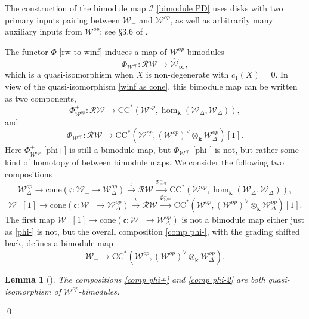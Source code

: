 \documentclass[11pt]{amsproc}
\def\K{{\mathbf{k}}}
\def\w{\mathcal{W}(E)}
\def\r#1{\mathrm{#1}}
\def\w{\mathcal{W}}
\def\rw{\mathcal{RW}}
\def\D{\Delta}
\def\cone{\mathrm{cone}}
\def\winf{\widehat{\w}_{\infty}}
\def\ck{\mathfrak{c}}
\newtheorem{lem}{Lemma}[section]
\theoremstyle{remark}
\numberwithin{equation}{section}
\begin{document}
The construction of the bimodule map $\mathcal{I}$ \eqref{bimodule PD} uses disks with two primary inputs pairing between $\w_{-}$ and $\w^{op}$, 
as well as arbitrarily many auxiliary inputs from $\w^{op}$; see \S 3.6 of \cite{GGV}.

The functor $\Phi$ \eqref{rw to winf} induces a map of $\w^{op}$-bimodules
\begin{equation}\label{rw to winf as bimod}
\Phi_{\w^{op}}: \rw \to \winf,
\end{equation}
which is a quasi-isomorphism when $X$ is non-degenerate with $c_{1}(X) = 0$.
In view of the quasi-isomorphism \eqref{winf as cone}, 
this bimodule map can be written as two components,
\begin{equation}\label{phi+}
\Phi^{+}_{\w^{op}}: \rw \to \r{CC}^{*}(\w^{op}, \hom_{\K}(\w_{\D}, \w_{\D})),
\end{equation}
and
\begin{equation}\label{phi-}
\Phi^{-}_{\w^{op}}: \rw \to \r{CC}^{*}(\w^{op}, (\w^{op})^{\vee} \otimes_{\K} \w_{\D}^{op})[1].
\end{equation}
Here $\Phi^{+}_{\w^{op}}$ \eqref{phi+} is still a bimodule map, 
but $\Phi^{-}_{\w^{op}}$ \eqref{phi-} is not, but rather some kind of homotopy of between bimodule maps.
We consider the following two compositions
\begin{equation}\label{comp phi+}
\w^{op}_{\D} \to \cone(\ck: \w_{-} \to \w^{op}_{\D}) \stackrel{\iota}\to \rw \stackrel{\Phi^{-}_{\w^{op}}}\to \r{CC}^{*}(\w^{op}, \hom_{\K}(\w_{\D}, \w_{\D})),
\end{equation}
\begin{equation}\label{comp phi-}
\w_{-}[1] \to \cone(\ck: \w_{-} \to \w^{op}_{\D}) \stackrel{\iota}\to \rw \stackrel{\Phi^{-}_{\w^{op}}}\to \r{CC}^{*}(\w^{op}, (\w^{op})^{\vee} \otimes_{\K} \w_{\D}^{op})[1].
\end{equation}
The first map $\w_{-}[1] \to \cone(\ck: \w_{-} \to \w^{op}_{\D})$ is not a bimodule map either just as \eqref{phi-} is not, 
but the overall composition \eqref{comp phi-}, with the grading shifted back, defines a bimodule map
\begin{equation}\label{comp phi-2}
\w_{-} \to \r{CC}^{*}(\w^{op}, (\w^{op})^{\vee} \otimes_{\K} \w_{\D}^{op}).
\end{equation}


\begin{lem}[{\cite[Corollary 5.15, Proposition 5.19, Lemma 5.22]{GGV}}]\label{lem: comp phi iso}
The compositions \eqref{comp phi+} and \eqref{comp phi-2} are both quasi-isomorphism of $\w^{op}$-bimodules.
\end{lem} \qed
\end{document}
